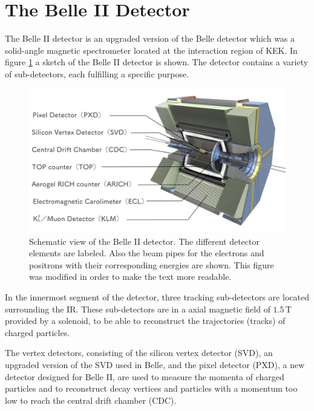 \documentclass[a4paper,11pt,twosided,final,german,openbib,pdftex,listof=totoc,bibliography=totoc]{scrbook}
\begin{document}
\section{The Belle II Detector}
\label{sec:Belle II}

The Belle II detector is an upgraded version of the Belle detector which was a solid-angle magnetic spectrometer located at the interaction region of KEK. In figure \ref{fig:Belle2} a sketch of the Belle II detector is shown. The detector contains a variety of sub-detectors, each fulfilling a specific purpose.
 
\begin{figure}[h!]
	\centering
	\includegraphics[width=\textwidth]{Bilder/Belle2.pdf}
	
	\caption[Belle II Detector]{Schematic view of the Belle II detector. The different detector elements are labeled. Also the beam pipes for the electrons and positrons with their corresponding energies are shown. \cite{BDetector} This figure was modified in order to make the text more readable.}
	\label{fig:Belle2}
\end{figure}

 In the innermost segment of the detector, three tracking sub-detectors are located surrounding the IR. These sub-detectors are in a axial magnetic field of $1.5\,\textrm{T}$ provided by a solenoid, to be able to reconstruct the trajectories (tracks) of charged particles. 
 
 The vertex detectors, consisting of the silicon vertex detector (SVD), an upgraded version of the SVD used in Belle, and the pixel detector (PXD), a new detector designed for Belle II, are used to measure the momenta of charged particles and to reconstruct decay vertices and particles with a momentum too low to reach the central drift chamber (CDC).
\end{document}
